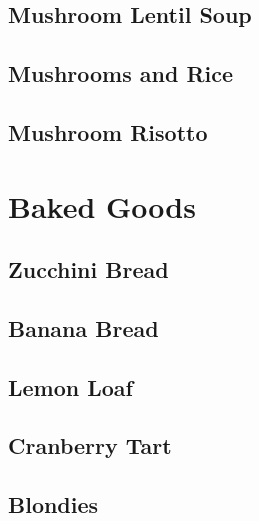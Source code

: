 \documentclass{report}
\begin{document}
\section{Mushroom Lentil Soup}

\newpage
%
\section{Mushrooms and Rice}

\newpage
%
\section{Mushroom Risotto}




\chapter{Baked Goods}
\newpage
\section{Zucchini Bread}


\newpage
\section{Banana Bread}


\newpage
\section{Lemon Loaf}


\newpage 
\section{Cranberry Tart}


\newpage
\section{Blondies}

\end{document}
